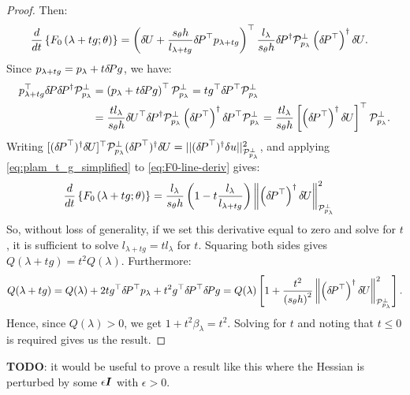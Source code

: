 \documentclass{standalone}
\begin{document}
\begin{proof}
  Then:
  \begin{align}\label{eq:F0-line-deriv}
    \frac{d}{dt} \left\{F_0\left(\lambda + t g; \theta\right)\right\} &= \left({\delta \hspace{-0.09em} U} + \frac{s_\theta h}{l_{\lambda + t g}} {\delta \hspace{-0.14em} P}^\top p_{\lambda + t g}\right)^\top \frac{l_\lambda}{s_\theta h} {\delta \hspace{-0.14em} P}^\dagger \mathcal{P}^\perp_{p_\lambda} \left({\delta \hspace{-0.14em} P}^\top\right)^\dagger {\delta \hspace{-0.09em} U}.
  \end{align}
  Since $p_{\lambda + tg} = p_\lambda + t {\delta \hspace{-0.14em} P} g$, we have:
  \begin{align}\label{eq:plam_t_g_simplified}
    p_{\lambda + t g}^\top {\delta \hspace{-0.14em} P} {\delta \hspace{-0.14em} P}^\dagger \mathcal{P}^\perp_{p_\lambda} &= \left(p_\lambda + t {\delta \hspace{-0.14em} P} g\right)^\top \mathcal{P}^\perp_{p_\lambda} = t g^\top {\delta \hspace{-0.14em} P}^\top \mathcal{P}^\perp_{p_\lambda} \\
                                                                                   &= \frac{t l_\lambda}{s_\theta h} {\delta \hspace{-0.09em} U}^\top {\delta \hspace{-0.14em} P}^\dagger \mathcal{P}^\perp_{p_\lambda} \left({\delta \hspace{-0.14em} P}^\top\right)^\dagger {\delta \hspace{-0.14em} P}^\top \mathcal{P}^\perp_{p_\lambda} = \frac{t l_\lambda}{s_\theta h} \left[\left({\delta \hspace{-0.14em} P}^\top\right)^\dagger {\delta \hspace{-0.09em} U}\right]^\top \mathcal{P}^\perp_{p_\lambda}.
  \end{align}
  Writing
  $[({\delta \hspace{-0.14em} P}^\top)^\dagger {\delta \hspace{-0.09em} U}]^\top \mathcal{P}^\perp_{p_\lambda}
  ({\delta \hspace{-0.14em} P}^\top)^\dagger {\delta \hspace{-0.09em} U} = ||({\delta \hspace{-0.14em} P}^\top)^\dagger \delta
  u||^2_{\mathcal{P}^\perp_{p_\lambda}}$, and applying
  \cref{eq:plam_t_g_simplified} to \cref{eq:F0-line-deriv} gives:
  \begin{align*}
    \frac{d}{dt} \left\{F_0\left(\lambda + t g; \theta\right)\right\} &= \frac{l_\lambda}{s_\theta h} \left(1 - t \frac{l_\lambda}{l_{\lambda + t g}}\right) \left\|\left({\delta \hspace{-0.14em} P}^\top\right)^\dagger {\delta \hspace{-0.09em} U}\right\|^2_{\mathcal{P}^\perp_{p_\lambda}}
  \end{align*}
  So, without loss of generality, if we set this derivative equal to
  zero and solve for $t$, it is sufficient to solve
  $l_{\lambda + t g} = t l_\lambda$ for $t$. Squaring both sides gives
  $Q(\lambda + t g) = t^2 Q(\lambda)$. Furthermore:
  \begin{align*}
    Q(\lambda + tg) = Q(\lambda) + 2tg^\top {\delta \hspace{-0.14em} P}^\top p_\lambda + t^2 g^\top {\delta \hspace{-0.14em} P}^\top {\delta \hspace{-0.14em} P} g = Q(\lambda) \left[1 + \frac{t^2}{{(s_\theta h)}^2} \left\|\left({\delta \hspace{-0.14em} P}^\top\right)^\dagger {\delta \hspace{-0.09em} U}\right\|^2_{\mathcal{P}^\perp_{p_\lambda}}\right].
  \end{align*}
  Hence, since $Q(\lambda) > 0$, we get $1 + t^2 \beta_\lambda =
  t^2$. Solving for $t$ and noting that $t \leq 0$ is required gives
  us the result.
\end{proof}

\textbf{TODO}: it would be useful to prove a result like this where
the Hessian is perturbed by some $\epsilon \boldsymbol{I}$ with $\epsilon > 0$.
\end{document}
